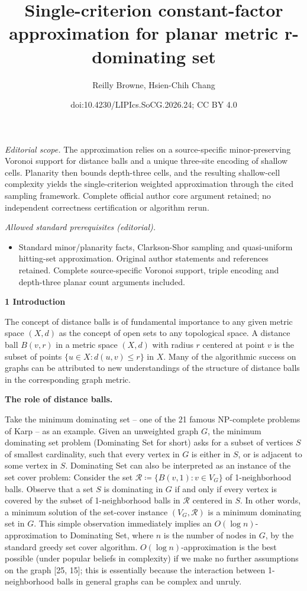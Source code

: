 \documentclass[10pt,a4paper]{article}
\title{Single-criterion constant-factor approximation for planar metric r-dominating set}
\author{Reilly Browne, Hsien-Chih Chang}
\date{doi:10.4230/LIPIcs.SoCG.2026.24; CC BY 4.0}
\begin{document}
\maketitle
\noindent\textit{Editorial scope.} The approximation relies on a source-specific minor-preserving Voronoi support for distance balls and a unique three-site encoding of shallow cells. Planarity then bounds depth-three cells, and the resulting shallow-cell complexity yields the single-criterion weighted approximation through the cited sampling framework. Complete official author core argument retained; no independent correctness certification or algorithm rerun.\par\medskip
\noindent\textit{Allowed standard prerequisites (editorial).}\begin{itemize}
\item Standard minor/planarity facts, Clarkson-Shor sampling and quasi-uniform hitting-set approximation. Original author statements and references retained. Complete source-specific Voronoi support, triple encoding and depth-three planar count arguments included.
\end{itemize}\medskip
\par\medskip\noindent\textbf{1 Introduction}\par
The concept of distance balls is of fundamental importance to any given metric space $(X,d)$ as the concept of open sets to any topological space. A distance ball $B(v,r)$ in a metric space $(X,d)$ with radius $r$ centered at point $v$ is the subset of points $\{u\in X:d(u,v)\leq r\}$ in $X$. Many of the algorithmic success on graphs can be attributed to new understandings of the structure of distance balls in the corresponding graph metric.
\par
\par
\par\medskip\noindent\textbf{The role of distance balls.}\par
Take the minimum dominating set – one of the 21 famous NP-complete problems of Karp – as an example. Given an unweighted graph $G$, the minimum dominating set problem (Dominating Set for short) asks for a subset of vertices $S$ of smallest cardinality, such that every vertex in $G$ is either in $S$, or is adjacent to some vertex in $S$. Dominating Set can also be interpreted as an instance of the set cover problem: Consider the set $\mathcal{R}\coloneqq\{B(v,1):v\in V_{G}\}$ of 1-neighborhood balls. Observe that a set $S$ is dominating in $G$ if and only if every vertex is covered by the subset of 1-neighborhood balls in $\mathcal{R}$ centered in $S$. In other words, a minimum solution of the set-cover instance $(V_{G},\mathcal{R})$ is a minimum dominating set in $G$. This simple observation immediately implies an $O(\log n)$-approximation to Dominating Set, where $n$ is the number of nodes in $G$, by the standard greedy set cover algorithm. $O(\log n)$-approximation is the best possible (under popular beliefs in complexity) if we make no further assumptions on the graph [25, 15]; this is essentially because the interaction between 1-neighborhood balls in general graphs can be complex and unruly.
\end{document}
